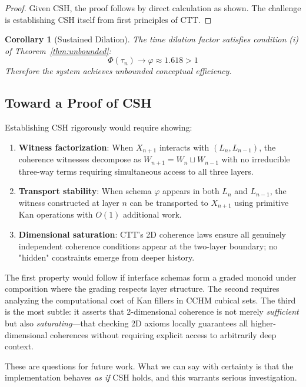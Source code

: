 \documentclass[11pt]{article}
\theoremstyle{definition}
\theoremstyle{plain}
\newtheorem{corollary}{Corollary}
\theoremstyle{remark}
\begin{document}
\begin{proof}
Given CSH, the proof follows by direct calculation as shown. The challenge is 
establishing CSH itself from first principles of CTT.
\end{proof}

\begin{corollary}[Sustained Dilation]
The time dilation factor satisfies condition (i) of Theorem~\ref{thm:unbounded}:
\[
\Phi(\tau_n) \to \varphi \approx 1.618 > 1
\]
Therefore the system achieves unbounded conceptual efficiency.
\end{corollary}

\subsection{Toward a Proof of CSH}

Establishing CSH rigorously would require showing:

\begin{enumerate}
\item \textbf{Witness factorization}: When $X_{n+1}$ interacts with 
$(L_n, L_{n-1})$, the coherence witnesses decompose as 
$W_{n+1} = W_n \sqcup W_{n-1}$ with no irreducible three-way terms requiring 
simultaneous access to all three layers.

\item \textbf{Transport stability}: When schema $\varphi$ appears in both 
$L_n$ and $L_{n-1}$, the witness constructed at layer $n$ can be transported 
to $X_{n+1}$ using primitive Kan operations with $O(1)$ additional work.

\item \textbf{Dimensional saturation}: CTT's 2D coherence laws ensure all 
genuinely independent coherence conditions appear at the two-layer boundary; 
no "hidden" constraints emerge from deeper history.
\end{enumerate}

The first property would follow if interface schemas form a graded monoid under 
composition where the grading respects layer structure. The second requires 
analyzing the computational cost of Kan fillers in CCHM cubical sets. The third 
is the most subtle: it asserts that 2-dimensional coherence is not merely 
\emph{sufficient} but also \emph{saturating}—that checking 2D axioms locally 
guarantees all higher-dimensional coherences without requiring explicit access 
to arbitrarily deep context.

These are questions for future work. What we can say with certainty is that 
the implementation behaves \emph{as if} CSH holds, and this warrants serious 
investigation.
\end{document}
